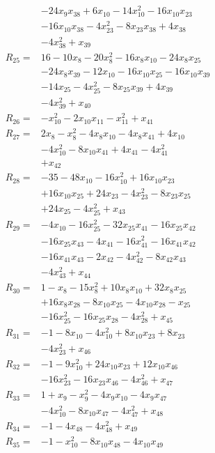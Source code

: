 \begin{align*}
&-24x_{9}x_{38} +6x_{10} -14x_{10}^{2} -16x_{10}x_{23}\\
&-16x_{10}x_{38} -4x_{23}^{2} -8x_{23}x_{38} +4x_{38}\\
&-4x_{38}^{2} +x_{39}\\[3pt]
R_{25}={}&16 -10x_{8} -20x_{8}^{2} -16x_{8}x_{10} -24x_{8}x_{25}\\
&-24x_{8}x_{39} -12x_{10} -16x_{10}x_{25} -16x_{10}x_{39}\\
&-14x_{25} -4x_{25}^{2} -8x_{25}x_{39} +4x_{39}\\
&-4x_{39}^{2} +x_{40}\\[3pt]
R_{26}={}&-x_{10}^{2} -2x_{10}x_{11} -x_{11}^{2} +x_{41}\\[3pt]
R_{27}={}&2x_{8} -x_{8}^{2} -4x_{8}x_{10} -4x_{8}x_{41} +4x_{10}\\
&-4x_{10}^{2} -8x_{10}x_{41} +4x_{41} -4x_{41}^{2}\\
&+x_{42}\\[3pt]
R_{28}={}&-35 -48x_{10} -16x_{10}^{2} +16x_{10}x_{23}\\
&+16x_{10}x_{25} +24x_{23} -4x_{23}^{2} -8x_{23}x_{25}\\
&+24x_{25} -4x_{25}^{2} +x_{43}\\[3pt]
R_{29}={}&-4x_{10} -16x_{25}^{2} -32x_{25}x_{41} -16x_{25}x_{42}\\
&-16x_{25}x_{43} -4x_{41} -16x_{41}^{2} -16x_{41}x_{42}\\
&-16x_{41}x_{43} -2x_{42} -4x_{42}^{2} -8x_{42}x_{43}\\
&-4x_{43}^{2} +x_{44}\\[3pt]
R_{30}={}&1 -x_{8} -15x_{8}^{2} +10x_{8}x_{10} +32x_{8}x_{25}\\
&+16x_{8}x_{28} -8x_{10}x_{25} -4x_{10}x_{28} -x_{25}\\
&-16x_{25}^{2} -16x_{25}x_{28} -4x_{28}^{2} +x_{45}\\[3pt]
R_{31}={}&-1 -8x_{10} -4x_{10}^{2} +8x_{10}x_{23} +8x_{23}\\
&-4x_{23}^{2} +x_{46}\\[3pt]
R_{32}={}&-1 -9x_{10}^{2} +24x_{10}x_{23} +12x_{10}x_{46}\\
&-16x_{23}^{2} -16x_{23}x_{46} -4x_{46}^{2} +x_{47}\\[3pt]
R_{33}={}&1 +x_{9} -x_{9}^{2} -4x_{9}x_{10} -4x_{9}x_{47}\\
&-4x_{10}^{2} -8x_{10}x_{47} -4x_{47}^{2} +x_{48}\\[3pt]
R_{34}={}&-1 -4x_{48} -4x_{48}^{2} +x_{49}\\[3pt]
R_{35}={}&-1 -x_{10}^{2} -8x_{10}x_{48} -4x_{10}x_{49}\\

\end{align*}
